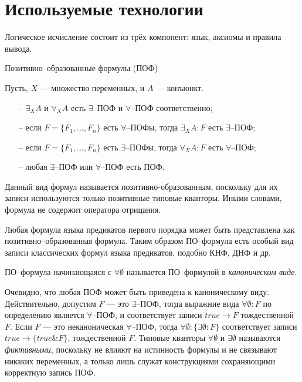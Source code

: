 \section{Используемые технологии}

	Логическое исчисление состоит из трёх компонент: язык, аксиомы и правила вывода.
    
Позитивно--образованные формулы (ПОФ)

Пусть, $X$ --- множество переменных, и $A$ --- конъюнкт.
\begin{itemize}

\item[--]$\exists_XA$ и $\forall_XA$ есть $\exists$--ПОФ и $\forall$--ПОФ соответственно;

\item[--] если $F = \{F_1,\ldots,F_n\}$ есть $\forall$--ПОФы, тогда $\exists_XA\colon F$ есть $\exists$--ПОФ;

\item[--] если $F = \{F_1,\ldots,F_n\}$ есть $\exists$--ПОФы, тогда $\forall_XA\colon F$ есть $\forall$--ПОФ;

\item[--] любая $\exists$--ПОФ или $\forall$--ПОФ есть ПОФ.

\end{itemize}


Данный вид формул называется позитивно-образованным, поскольку для их записи используются только позитивные типовые кванторы. Иными словами, формула не содержит оператора отрицания.

Любая формула языка предикатов первого порядка может быть представлена как позитивно--образованная формула. Таким образом ПО--формула есть особый вид записи классических формул языка предикатов, подобно КНФ, ДНФ и др.

ПО--формула начинающаяся с $\forall \emptyset$ называется ПО--формулой в {\em каноническом виде}.

Очевидно, что любая ПОФ может быть приведена к каноническому виду. Действительно, допустим $F$ --- это $\exists$--ПОФ, тогда выражние вида $\forall \emptyset\colon F$ по определению является $\forall$--ПОФ, и соответствует записи $true \rightarrow F$ тождественной $F$. Если $F$ --- это неканоническая $\forall$--ПОФ, тогда $\forall \emptyset\colon\{\exists \emptyset\colon F\}$ соответствует записи $true \rightarrow \{true\&F\}$, тождественной $F$. Типовые кванторы $\forall \emptyset$ и $\exists \emptyset$ называются {\em фиктивными}, поскольку не влияют на истинность формулы и не связывают никаких переменных, а только лишь служат конструкциями сохраняющими корректную запись ПОФ.


